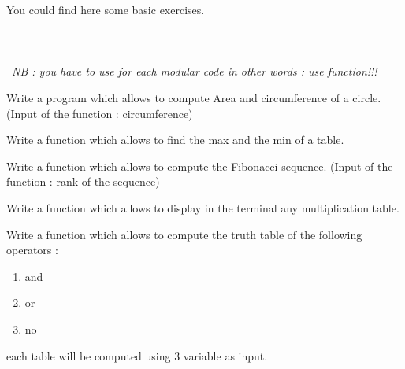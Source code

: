 \documentclass[12pt]{tdtp}
\begin{document}
\titre
You could find here some basic exercises.\\
\\
\\
\\\
\textit{NB : you have to use for each modular code in other words : use function!!!}

\Exo


Write a program which allows to compute Area and circumference of a circle. (Input of the function : circumference)

\Exo


Write a function which allows to find the max and the min of a table.

\Exo 

Write a function which allows to compute the Fibonacci sequence. (Input of the function : rank of the sequence)

\Exo


Write a function which allows to display in the terminal any multiplication table.
\Exo

Write a function which allows to compute the truth table of the following operators : 
\begin{enumerate}
	\item and
	\item or
	\item no
\end{enumerate}

each table will be computed using 3 variable as input.

\end{document}
